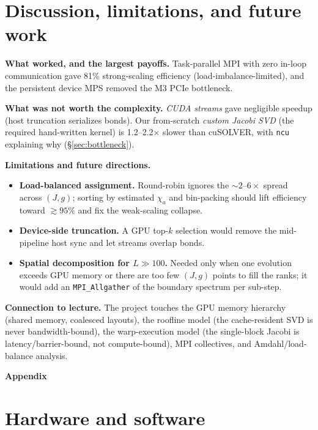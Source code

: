 \documentclass[11pt]{article}
\newcommand{\code}[1]{\texttt{#1}}
\begin{document}
\section{Discussion, limitations, and future work}

\textbf{What worked, and the largest payoffs.} Task-parallel MPI with zero in-loop communication gave 81\% strong-scaling efficiency (load-imbalance-limited), and the persistent device MPS removed the M3 PCIe bottleneck.

\textbf{What was not worth the complexity.} \textit{CUDA streams} gave negligible speedup (host truncation serializes bonds). Our from-scratch \textit{custom Jacobi SVD} (the required hand-written kernel) is 1.2--2.2$\times$ slower than cuSOLVER, with \code{ncu} explaining why (\S\ref{sec:bottleneck}).

\textbf{Limitations and future directions.}
\begin{itemize}
\item \textbf{Load-balanced assignment.} Round-robin ignores the $\sim2$--$6\times$ spread across $(J,g)$; sorting by estimated $\chi_a$ and bin-packing should lift efficiency toward $\gtrsim95\%$ and fix the weak-scaling collapse.

\item \textbf{Device-side truncation.} A GPU top-$k$ selection would remove the mid-pipeline host sync and let streams overlap bonds.

\item \textbf{Spatial decomposition for $L\gg100$.} Needed only when one evolution exceeds GPU memory or there are too few $(J,g)$ points to fill the ranks; it would add an \code{MPI\_Allgather} of the boundary spectrum per sub-step.
\end{itemize}

\textbf{Connection to lecture.} The project touches the GPU memory hierarchy (shared memory, coalesced layouts), the roofline model (the cache-resident SVD is never bandwidth-bound), the warp-execution model (the single-block Jacobi is latency/barrier-bound, not compute-bound), MPI collectives, and Amdahl/load-balance analysis.

\clearpage
\appendix
\begin{center}{\Large\bfseries Appendix}\end{center}

\section{Hardware and software}
\end{document}
